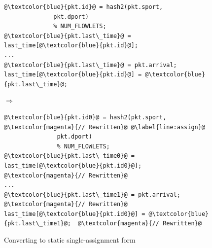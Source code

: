 \begin{figure}[!t]
  \begin{minipage}{\textwidth}
  \begin{minipage}{0.4\textwidth}
  \begin{small}
  \begin{lstlisting}[style=customcscriptsize, numbers=none, frame=none]
@\textcolor{blue}{pkt.id}@ = hash2(pkt.sport,
              pkt.dport)
              % NUM_FLOWLETS;
@\textcolor{blue}{pkt.last\_time}@ = last_time[@\textcolor{blue}{pkt.id}@];
...
@\textcolor{blue}{pkt.last\_time}@ = pkt.arrival;
last_time[@\textcolor{blue}{pkt.id}@] = @\textcolor{blue}{pkt.last\_time}@;
  \end{lstlisting}
  \end{small}
  \end{minipage}
  $\Longrightarrow$
  \hspace{-0.2in}
%
  \begin{minipage}{0.6\textwidth}
  \begin{small}
  \begin{lstlisting}[style=customcscriptsize, numbers=none, frame=none]
@\textcolor{blue}{pkt.id0}@ = hash2(pkt.sport,            @\textcolor{magenta}{// Rewritten}@ @\label{line:assign}@
               pkt.dport)
               % NUM_FLOWLETS;  
@\textcolor{blue}{pkt.last\_time0}@ = last_time[@\textcolor{blue}{pkt.id0}@];  @\textcolor{magenta}{// Rewritten}@
...
@\textcolor{blue}{pkt.last\_time1}@ = pkt.arrival;         @\textcolor{magenta}{// Rewritten}@
last_time[@\textcolor{blue}{pkt.id0}@] = @\textcolor{blue}{pkt.last\_time1}@;  @\textcolor{magenta}{// Rewritten}@
  \end{lstlisting}
  \end{small}
  \end{minipage}
  \caption[title]{Converting to static single-assignment form}
  \label{fig:ssa}
\end{minipage}
\end{figure}


